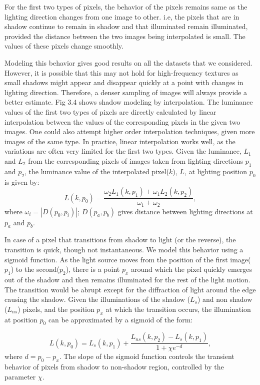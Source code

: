 For the first two types of pixels, the behavior of the pixels remains same as
the lighting direction changes from one image to other. i.e, the pixels that are
in shadow continue to remain in shadow and that illuminated remain illuminated,
provided the distance between the two images being interpolated is small. The
values of these pixels change smoothly.

Modeling this behavior gives good results on all the datasets that we
considered. However, it is possible that this may not hold for high-frequency
textures as small shadows might appear and disappear quickly at a point with
changes in lighting direction. Therefore, a denser sampling of images will
always provide a better estimate. Fig 3.4 shows shadow
modeling by interpolation. The luminance values of the first two types of
pixels are directly calculated by linear interpolation between the values of the
corresponding pixels in the given two images. One could also attempt higher
order interpolation techniques, given more images of the same type. In practice,
linear interpolation works well, as the variations are often very limited for
the first two types. Given the luminance, $L_1$ and $L_2$ from the
corresponding pixels of images taken from lighting directions $p_1$ and $p_2$,
the luminance value of the interpolated pixel($k$), $L$, at lighting position $p_0$ is given
by:
\begin{equation}
L(k,p_0)=\frac{\omega_2 L_1(k,p_1) + \omega_1 L_2(k,p_2)}{\omega_1 + \omega_2},
\end{equation}
where $\omega_i = |D(p_0,p_i)|$; $D(p_a,p_b)$ gives distance between lighting
directions at $p_a$ and $p_b$.

In case of a pixel that transitions from shadow to light (or the reverse), the
transition is quick, though not instantaneous. We model this behavior using a
sigmoid function. As the light source moves from the position of the first
image($p_1$) to  the second($p_2$), there is a point $p_x$ around which the
pixel quickly emerges out of the shadow and then remains illuminated for the
rest of the light motion. The transition would be abrupt except for the
diffraction of light around the edge causing the shadow. Given the illuminations
of the shadow ($L_s$) and non shadow ($L_{ns}$) pixels, and the position $p_x$
at which the transition occurs, the illumination at position $p_0$ can be
approximated by a sigmoid of the form:


\begin{equation}
L(k,p_0) = L_{s}(k,p_1) + \frac{L_{ns}(k,p_2) - L_{s}(k,p_1)}{1 + \chi e^{-d}},
\end{equation}
where $d = p_0 - p_x$. The slope of the sigmoid function controls the transient
behavior of pixels from shadow to non-shadow region, controlled by the parameter
$\chi$.

